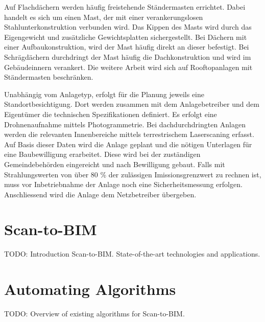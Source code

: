 Auf Flachdächern werden häufig freistehende Ständermasten errichtet. Dabei handelt es sich um einen Mast, der mit einer verankerungslosen Stahlunterkonstruktion verbunden wird. Das Kippen des Masts wird durch das Eigengewicht und zusätzliche Gewichtsplatten sichergestellt. Bei Dächern mit einer Aufbaukonstruktion, wird der Mast häufig direkt an dieser befestigt. Bei Schrägdächern durchdringt der Mast häufig die Dachkonstruktion und wird im Gebäudeinnern verankert. Die weitere Arbeit wird sich auf Rooftopanlagen mit Ständermasten beschränken.

Unabhängig vom Anlagetyp, erfolgt für die Planung jeweils eine Standortbesichtigung. Dort werden zusammen mit dem Anlagebetreiber und dem Eigentümer die technischen Spezifikationen definiert. Es erfolgt eine Drohnenaufnahme mittels Photogrammetrie. Bei dachdurchdringten Anlagen werden die relevanten Innenbereiche mittels terrestrischem Laserscaning erfasst. Auf Basis dieser Daten wird die Anlage geplant und die nötigen Unterlagen für eine Baubewilligung erarbeitet. Diese wird bei der zuständigen Gemeindebehörden eingereicht und nach Bewilligung gebaut. Falls mit Strahlungswerten von über 80 \% der zulässigen Imissionsgrenzwert zu rechnen ist, muss vor Inbetriebnahme der Anlage noch eine Sicherheitsmessung erfolgen. Anschliessend wird die Anlage dem Netzbetreiber übergeben. \cite{behnkeGrundkursMobilfunkUnd2022}  







\section{Scan-to-BIM}
TODO: Introduction Scan-to-BIM. State-of-the-art technologies and applications.

\section{Automating Algorithms}
TODO: Overview of existing algorithms for Scan-to-BIM.